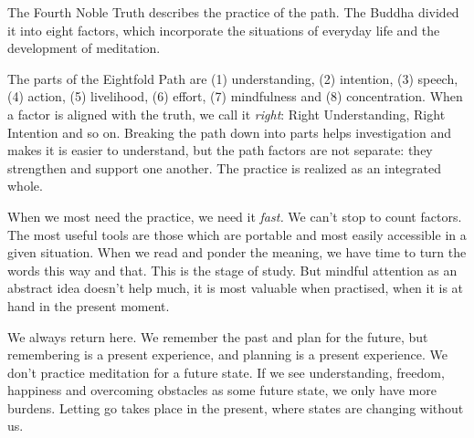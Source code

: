The Fourth Noble Truth describes the practice of the path. The Buddha
divided it into eight factors, which incorporate the situations of
everyday life and the development of meditation.

The parts of the Eightfold Path are (1) understanding, (2) intention,
(3) speech, (4) action, (5) livelihood, (6) effort, (7) mindfulness and
(8) concentration. When a factor is aligned with the truth, we call it
\emph{right}: Right Understanding, Right Intention and so on. Breaking
the path down into parts helps investigation and makes it is easier to
understand, but the path factors are not separate: they strengthen and
support one another. The practice is realized as an integrated whole.

When we most need the practice, we need it \emph{fast.} We can't stop to
count factors. The most useful tools are those which are portable and
most easily accessible in a given situation. When we read and ponder the
meaning, we have time to turn the words this way and that. This is the
stage of study. But mindful attention as an abstract idea doesn't help
much, it is most valuable when practised, when it is at hand in the
present moment.

We always return here. We remember the past and plan for the future, but
remembering is a present experience, and planning is a present
experience. We don't practice meditation for a future state. If we see
understanding, freedom, happiness and overcoming obstacles as some
future state, we only have more burdens. Letting go takes place in the
present, where states are changing without us.
